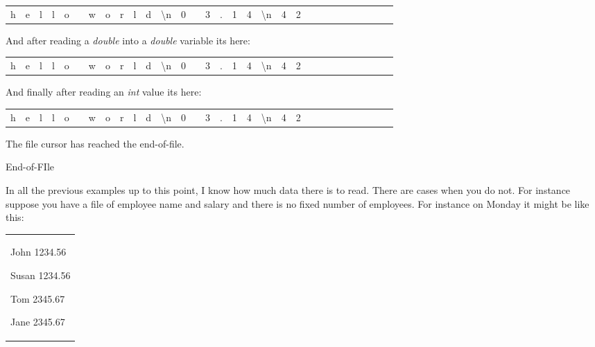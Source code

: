 \documentclass[
]{article}
\begin{document}
\begin{longtable}[]{@{}llllllllllllllllllllllllllllll@{}}
\toprule\noalign{}
& & & & & & & & & & & & & & & & & & & & & & & & & & & & & \\
\midrule\noalign{}
\endhead
\bottomrule\noalign{}
\endlastfoot
h & e & l & l & o & & w & o & r & l & d & \textbackslash n & 0 & & 3 & .
& 1 & 4 & \textbackslash n & 4 & 2 & & & & & & & & & \\
\end{longtable}

And after reading a \emph{double} into a \emph{double} variable
it\textquotesingle s here:

\begin{longtable}[]{@{}llllllllllllllllllllllllllllll@{}}
\toprule\noalign{}
& & & & & & & & & & & & & & & & & & & & & & & & & & & & & \\
\midrule\noalign{}
\endhead
\bottomrule\noalign{}
\endlastfoot
h & e & l & l & o & & w & o & r & l & d & \textbackslash n & 0 & & 3 & .
& 1 & 4 & \textbackslash n & 4 & 2 & & & & & & & & & \\
\end{longtable}

And finally after reading an \emph{int} value it\textquotesingle s here:

\begin{longtable}[]{@{}llllllllllllllllllllllllllllll@{}}
\toprule\noalign{}
& & & & & & & & & & & & & & & & & & & & & & & & & & & & & \\
\midrule\noalign{}
\endhead
\bottomrule\noalign{}
\endlastfoot
h & e & l & l & o & & w & o & r & l & d & \textbackslash n & 0 & & 3 & .
& 1 & 4 & \textbackslash n & 4 & 2 & & & & & & & & & \\
\end{longtable}

The file cursor has reached the end-of-file.

End-of-FIle

In all the previous examples up to this point, I know how much data
there is to read. There are cases when you do not. For instance suppose
you have a file of employee name and salary and there is no fixed number
of employees. For instance on Monday it might be like this:

\begin{longtable}[]{@{}
  >{\raggedright\arraybackslash}p{}@{}}
\toprule\noalign{}
 \\
\midrule\noalign{}
\endhead
\bottomrule\noalign{}
\endlastfoot
John 1234.56

Susan 1234.56

Tom 2345.67

Jane 2345.67 \\
\end{longtable}
\end{document}
